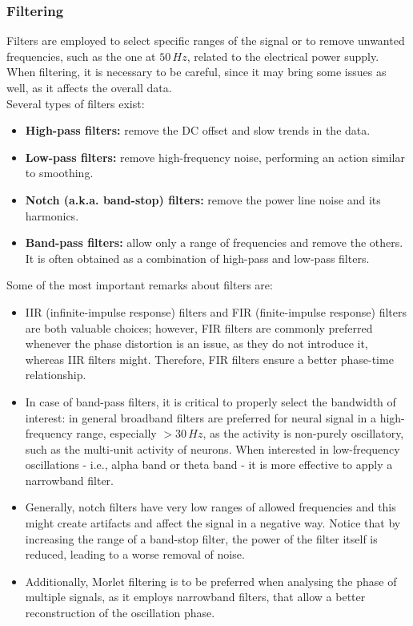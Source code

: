 \subsubsection{Filtering}
Filters are employed to select specific ranges of the signal or to remove unwanted frequencies,
such as the one at \(50\,Hz\), related to the electrical power supply. When filtering, it is
necessary to be careful, since it may bring some issues as well, as it affects the overall
data.\\
Several types of filters exist:
\begin{itemize}
    \item \textbf{High-pass filters:} remove the DC offset and slow trends in the data.
    \item \textbf{Low-pass filters:} remove high-frequency noise, performing an action
          similar to smoothing.
    \item \textbf{Notch (a.k.a. band-stop) filters:} remove the power line noise and its harmonics.
    \item \textbf{Band-pass filters:} allow only a range of frequencies and remove the others.
          It is often obtained as a combination of high-pass and low-pass filters.
\end{itemize}
Some of the most important remarks about filters are:
\begin{itemize}
    \item IIR (infinite-impulse response) filters and FIR (finite-impulse response)
          filters are both valuable choices; however, FIR filters are commonly preferred
          whenever the phase distortion is an issue, as they do not introduce it, whereas
          IIR filters might. Therefore, FIR filters ensure a better phase-time relationship.
    \item In case of band-pass filters, it is critical to properly select the
          bandwidth of interest: in general broadband filters are preferred for neural
          signal in a high-frequency range, especially \(>30\,Hz\), as the activity
          is non-purely oscillatory, such as the multi-unit activity of neurons. When
          interested in low-frequency oscillations - i.e., alpha band or theta band - it is
          more effective to apply a narrowband filter.
    \item Generally, notch filters have very low ranges of allowed frequencies and
          this might create artifacts and affect the signal in a negative way. Notice
          that by increasing the range of a band-stop filter, the power of the filter itself
          is reduced, leading to a worse removal of noise.
    \item Additionally, Morlet filtering is to be preferred when analysing the phase
          of multiple signals, as it employs narrowband filters, that allow a better reconstruction
          of the oscillation phase.
\end{itemize}
